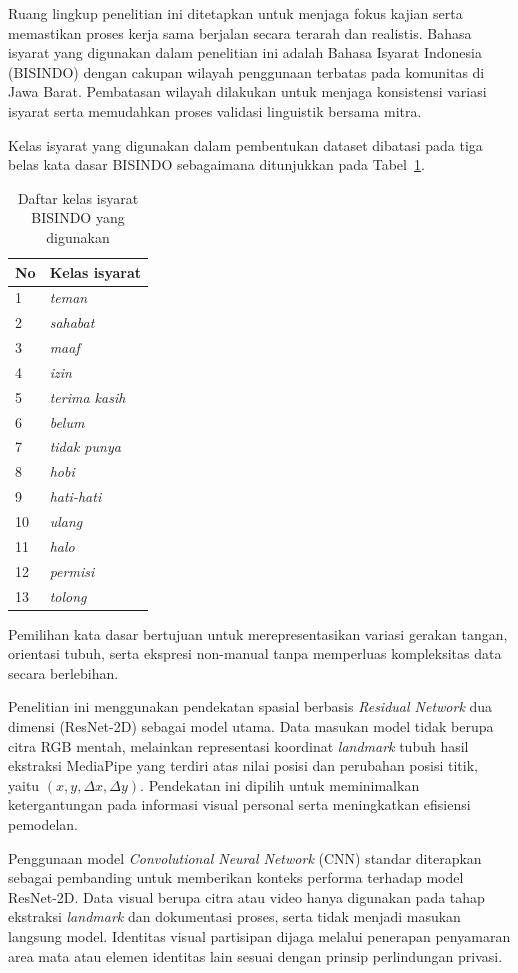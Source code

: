 Ruang lingkup penelitian ini ditetapkan untuk menjaga fokus kajian serta memastikan proses kerja sama berjalan secara terarah dan realistis.
Bahasa isyarat yang digunakan dalam penelitian ini adalah Bahasa Isyarat Indonesia (BISINDO) dengan cakupan wilayah penggunaan terbatas pada komunitas di Jawa Barat.
Pembatasan wilayah dilakukan untuk menjaga konsistensi variasi isyarat serta memudahkan proses validasi linguistik bersama mitra.

Kelas isyarat yang digunakan dalam pembentukan dataset dibatasi pada tiga belas kata dasar BISINDO sebagaimana ditunjukkan pada Tabel~\ref{tab:kelas-isyarat-bisindo}.

\begin{table}[h]
\centering
\caption{Daftar kelas isyarat BISINDO yang digunakan}
\label{tab:kelas-isyarat-bisindo}
\begin{tabular}{ll}
\hline
No & Kelas isyarat \\
\hline
1 & \textit{teman} \\
2 & \textit{sahabat} \\
3 & \textit{maaf} \\
4 & \textit{izin} \\
5 & \textit{terima kasih} \\
6 & \textit{belum} \\
7 & \textit{tidak punya} \\
8 & \textit{hobi} \\
9 & \textit{hati-hati} \\
10 & \textit{ulang} \\
11 & \textit{halo} \\
12 & \textit{permisi} \\
13 & \textit{tolong} \\
\hline
\end{tabular}
\end{table}

Pemilihan kata dasar bertujuan untuk merepresentasikan variasi gerakan tangan, orientasi tubuh, serta ekspresi non-manual tanpa memperluas kompleksitas data secara berlebihan.

Penelitian ini menggunakan pendekatan spasial berbasis \textit{Residual Network} dua dimensi (ResNet-2D) sebagai model utama.
Data masukan model tidak berupa citra RGB mentah, melainkan representasi koordinat \textit{landmark} tubuh hasil ekstraksi MediaPipe yang terdiri atas nilai posisi dan perubahan posisi titik, yaitu $(x, y, \Delta x, \Delta y)$.
Pendekatan ini dipilih untuk meminimalkan ketergantungan pada informasi visual personal serta meningkatkan efisiensi pemodelan.

Penggunaan model \textit{Convolutional Neural Network} (CNN) standar diterapkan sebagai pembanding untuk memberikan konteks performa terhadap model ResNet-2D.
Data visual berupa citra atau video hanya digunakan pada tahap ekstraksi \textit{landmark} dan dokumentasi proses, serta tidak menjadi masukan langsung model.
Identitas visual partisipan dijaga melalui penerapan penyamaran area mata atau elemen identitas lain sesuai dengan prinsip perlindungan privasi.